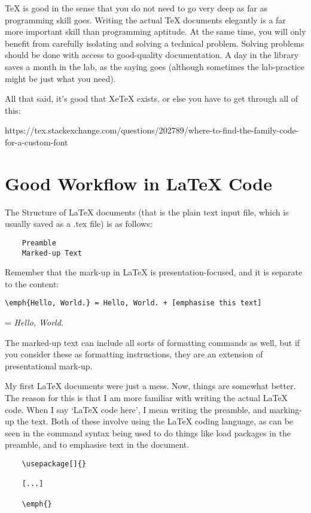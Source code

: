 \documentclass[11pt, oneside]{memoir}
\begin{document}
TeX is good in the sense that you do not need to go very deep as far as programming skill goes. Writing the actual TeX documents elegantly is a far more important skill than programming aptitude. At the same time, you will only benefit from carefully isolating and solving a technical problem. Solving problems should be done with access to good-quality documentation. A day in the library saves a month in the lab, as the saying goes (although sometimes the lab-practice might be just what you need).

All that said, it's good that XeTeX exists, or else you have to get through all of this:

https://tex.stackexchange.com/questions/202789/where-to-find-the-family-code-for-a-custom-font

\section{Good Workflow in LaTeX Code}
The Structure of LaTeX documents (that is the plain text input file, which is usually saved as a .tex file) is as follows:

\begin{verbatim}
    Preamble
    Marked-up Text
\end{verbatim}

Remember that the mark-up in LaTeX is presentation-focused, and it is separate to the content: 

\begin{verbatim}
\emph{Hello, World.} = Hello, World. + [emphasise this text]
\end{verbatim}
= \emph{Hello, World.}

The marked-up text can include all sorts of formatting commands as well, but if you consider these as formatting instructions, they are an extension of presentational mark-up.

My first LaTeX documents were just a mess. Now, things are somewhat better. The reason for this is that I am more familiar with writing the actual LaTeX code. When I say `LaTeX code here', I mean writing the preamble, and marking-up the text. Both of these involve using the LaTeX coding language, as can be seen in the command syntax being used to do things like load packages in the preamble, and to emphasise text in the document.

\begin{verbatim}
    \usepackage[]{}

    [...]

    \emph{}
\end{verbatim}
\end{document}
